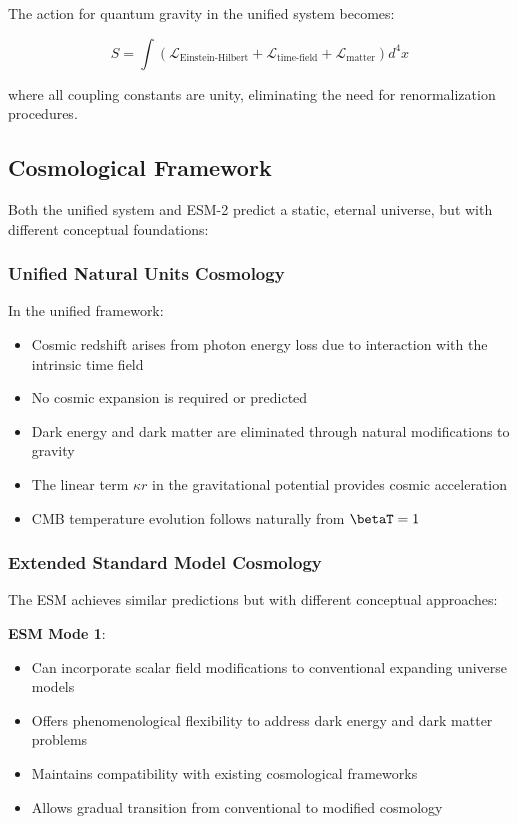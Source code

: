 	The action for quantum gravity in the unified system becomes:
	
	\begin{equation}
		S = \int \left( \mathcal{L}_{\text{Einstein-Hilbert}} + \mathcal{L}_{\text{time-field}} + \mathcal{L}_{\text{matter}} \right) d^4x
	\end{equation}
	
	where all coupling constants are unity, eliminating the need for renormalization procedures.
	
	\subsection{Cosmological Framework}
	\label{subsec:cosmological_framework}
	
	Both the unified system and ESM-2 predict a static, eternal universe, but with different conceptual foundations:
	
	\subsubsection{Unified Natural Units Cosmology}
	\label{subsubsec:unified_cosmology}
	
	In the unified framework:
	\begin{itemize}
		\item Cosmic redshift arises from photon energy loss due to interaction with the intrinsic time field
		\item No cosmic expansion is required or predicted
		\item Dark energy and dark matter are eliminated through natural modifications to gravity
		\item The linear term $\kappa r$ in the gravitational potential provides cosmic acceleration
		\item CMB temperature evolution follows naturally from $\betaT = 1$
	\end{itemize}
	
	\subsubsection{Extended Standard Model Cosmology}
	\label{subsubsec:esm_cosmology}
	
	The ESM achieves similar predictions but with different conceptual approaches:
	
	\textbf{ESM Mode 1}:
	\begin{itemize}
		\item Can incorporate scalar field modifications to conventional expanding universe models
		\item Offers phenomenological flexibility to address dark energy and dark matter problems
		\item Maintains compatibility with existing cosmological frameworks
		\item Allows gradual transition from conventional to modified cosmology
	\end{itemize}
	
